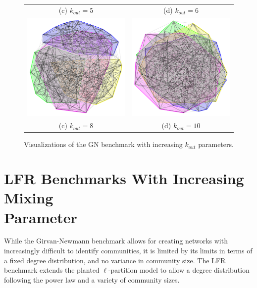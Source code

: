 \begin{figure}
\begin{tabular}{cc}
		(c) $k_{out}=5$ & (d) $k_{out}=6$ \\[6pt]
		\includegraphics[width=65mm]{images/girvan_kout_8_0.png} &   \includegraphics[width=65mm]{images/girvan_kout_10_0.png} \\
		(c) $k_{out}=8$ & (d) $k_{out}=10$ \\[6pt]
		
	\end{tabular}
	\caption{Visualizations of the GN benchmark with increasing $k_{out}$ parameters.}
\end{figure}



\section{LFR Benchmarks With Increasing Mixing \\ Parameter}
While the Girvan-Newmann benchmark allows for creating networks with increasingly difficult to identify communities, it is limited by its limits in terms of a fixed degree distribution, and no variance in community size. The LFR benchmark extends the planted $\ell$-partition model to allow a degree distribution following the power law and a variety of community sizes. 

